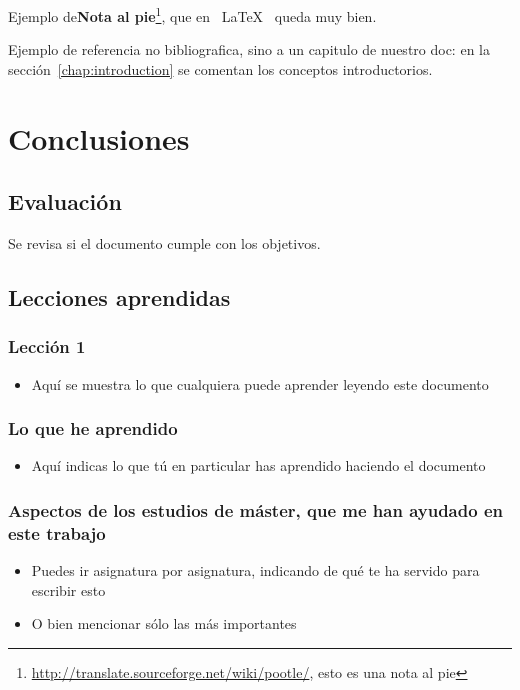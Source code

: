 \documentclass[a4paper, 12pt]{book}
\begin{document}
Ejemplo de\textbf{Nota al pie}\footnote{\url{
http://translate.sourceforge.net/wiki/pootle/}, esto es una nota al pie}, 
que en ~\LaTeX~ queda muy bien.


Ejemplo de referencia no bibliografica, sino a un capitulo de nuestro doc:
en la sección~\ref{chap:introduction} se comentan los conceptos introductorios.


\chapter{Conclusiones}
\label{chap:conclusions}


\section{Evaluación}

Se revisa si el documento cumple con los objetivos.




\section{Lecciones aprendidas}
\label{sec:lessons}

\subsection{Lección 1}
\begin{itemize}
 \item Aquí se muestra lo que cualquiera puede aprender leyendo este documento
\end{itemize}

\subsection{Lo que he aprendido}
\begin{itemize}
 \item Aquí indicas lo que tú en particular has aprendido haciendo el documento
\end{itemize}


\subsection{Aspectos de los estudios de máster, que me han ayudado en este trabajo}
\begin{itemize}
 \item Puedes ir asignatura por asignatura, indicando de qué te ha servido para escribir esto
 \item O bien mencionar sólo las más importantes

\end{itemize}
\end{document}

